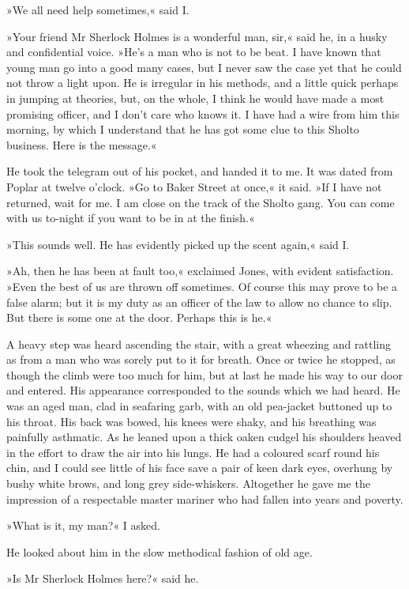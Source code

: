 »We all need help sometimes,« said I.

»Your friend Mr Sherlock Holmes is a wonderful man, sir,« said he, in a husky and confidential voice. »He's a man who is not to be beat. I have known that young man go into a good many cases, but I never saw the case yet that he could not throw a light upon. He is irregular in his methods, and a little quick perhaps in jumping at theories, but, on the whole, I think he would have made a most promising officer, and I don't care who knows it. I have had a wire from him this morning, by which I understand that he has got some clue to this Sholto business. Here is the message.«

He took the telegram out of his pocket, and handed it to me. It was dated from Poplar at twelve o'clock. »Go to Baker Street at once,« it said. »If I have not returned, wait for me. I am close on the track of the Sholto gang. You can come with us to-night if you want to be in at the finish.«

»This sounds well. He has evidently picked up the scent again,« said I.

»Ah, then he has been at fault too,« exclaimed Jones, with evident satisfaction. »Even the best of us are thrown off sometimes. Of course this may prove to be a false alarm; but it is my duty as an officer of the law to allow no chance to slip. But there is some one at the door. Perhaps this is he.«

A heavy step was heard ascending the stair, with a great wheezing and rattling as from a man who was sorely put to it for breath. Once or twice he stopped, as though the climb were too much for him, but at last he made his way to our door and entered. His appearance corresponded to the sounds which we had heard. He was an aged man, clad in seafaring garb, with an old pea-jacket buttoned up to his throat. His back was bowed, his knees were shaky, and his breathing was painfully asthmatic. As he leaned upon a thick oaken cudgel his shoulders heaved in the effort to draw the air into his lungs. He had a coloured scarf round his chin, and I could see little of his face save a pair of keen dark eyes, overhung by bushy white brows, and long grey side-whiskers. Altogether he gave me the impression of a respectable master mariner who had fallen into years and poverty.

»What is it, my man?« I asked.

He looked about him in the slow methodical fashion of old age.

»Is Mr Sherlock Holmes here?« said he.

